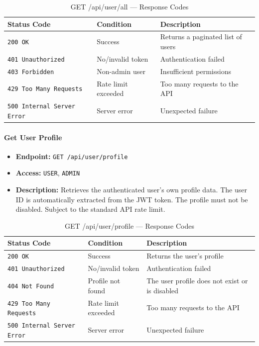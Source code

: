 \begin{table}[H]
\centering
\renewcommand{\arraystretch}{1.3}
\begin{tabularx}{\textwidth}{|l|l|X|}
\hline
\textbf{Status Code} & \textbf{Condition} & \textbf{Description} \\
\hline
\texttt{200 OK}           & Success      & Returns a paginated list of users \\
\hline
\texttt{401 Unauthorized} & No/invalid token & Authentication failed \\
\hline
\texttt{403 Forbidden}    & Non-admin user   & Insufficient permissions \\
\hline
\texttt{429 Too Many Requests} & Rate limit exceeded & Too many requests to the API \\
\hline
\texttt{500 Internal Server Error} & Server error & Unexpected failure \\
\hline
\end{tabularx}
\caption{GET /api/user/all — Response Codes}
\label{tab:get-all-users-responses}
\end{table}
\FloatBarrier

\paragraph{Get User Profile}
\label{subsubsec:get-user-profile}

\begin{itemize}
  \item \textbf{Endpoint:} \texttt{GET /api/user/profile}
  \item \textbf{Access:} \texttt{USER}, \texttt{ADMIN}
  \item \textbf{Description:} Retrieves the authenticated user's own profile data. The user ID is automatically extracted from the JWT token. The profile must not be disabled. Subject to the standard API rate limit.
\end{itemize}

\begin{table}[H]
\centering
\renewcommand{\arraystretch}{1.3}
\begin{tabularx}{\textwidth}{|l|l|X|}
\hline
\textbf{Status Code} & \textbf{Condition} & \textbf{Description} \\
\hline
\texttt{200 OK}           & Success              & Returns the user's profile \\
\hline
\texttt{401 Unauthorized} & No/invalid token     & Authentication failed \\
\hline
\texttt{404 Not Found}    & Profile not found    & The user profile does not exist or is disabled \\
\hline
\texttt{429 Too Many Requests} & Rate limit exceeded & Too many requests to the API \\
\hline
\texttt{500 Internal Server Error} & Server error & Unexpected failure \\
\hline
\end{tabularx}
\caption{GET /api/user/profile — Response Codes}
\label{tab:get-user-profile-responses}
\end{table}
\FloatBarrier

